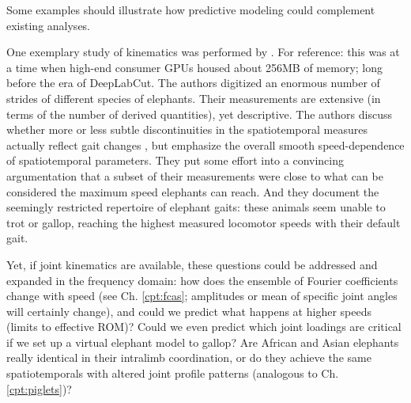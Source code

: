 Some examples should illustrate how predictive modeling could complement existing analyses.

One exemplary study of kinematics was performed by \citet{Hutchinson2006}.
For reference: this was at a time when high-end consumer GPUs housed about 256MB of memory; long before the era of DeepLabCut.
The authors digitized an enormous number of strides of different species of elephants.
Their measurements are extensive (in terms of the number of derived quantities), yet descriptive.
The authors discuss whether more or less subtle discontinuities in the spatiotemporal measures actually reflect gait changes \citep{Alexander1989}, but emphasize the overall smooth speed-dependence of spatiotemporal parameters.
They put some effort into a convincing argumentation that a subset of their measurements were close to what can be considered the maximum speed elephants can reach.
And they document the seemingly restricted repertoire of elephant gaits: these animals seem unable to trot or gallop, reaching the highest measured locomotor speeds with their default gait.

Yet, if joint kinematics are available, these questions could be addressed and expanded in the frequency domain: how does the ensemble of Fourier coefficients change with speed (see Ch. \ref{cpt:fcas}; amplitudes or mean of specific joint angles will certainly change), and could we predict what happens at higher speeds (limits to effective ROM)?
Could we even predict which joint loadings are critical if we set up a virtual elephant model to gallop?
Are African and Asian elephants really identical in their intralimb coordination, or do they achieve the same spatiotemporals with altered joint profile patterns (analogous to Ch. \ref{cpt:piglets})?



